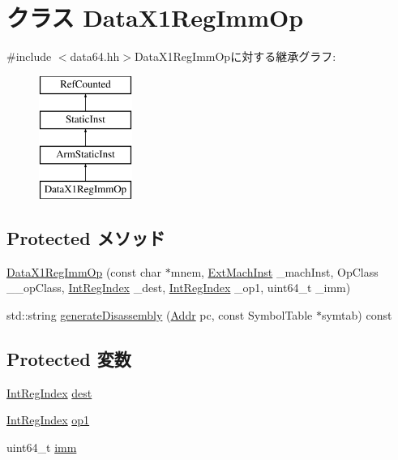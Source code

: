 \hypertarget{classArmISA_1_1DataX1RegImmOp}{
\section{クラス DataX1RegImmOp}
\label{classArmISA_1_1DataX1RegImmOp}
}


{\ttfamily \#include $<$data64.hh$>$}DataX1RegImmOpに対する継承グラフ:\begin{figure}[H]
\begin{center}
\leavevmode
\includegraphics[height=4cm]{classArmISA_1_1DataX1RegImmOp}
\end{center}
\end{figure}
\subsection*{Protected メソッド}
\begin{DoxyCompactItemize}
\item 
\hyperlink{classArmISA_1_1DataX1RegImmOp_a060333d6accb9a30048d5a4fae502f3b}{DataX1RegImmOp} (const char $\ast$mnem, \hyperlink{classStaticInst_a5605d4fc727eae9e595325c90c0ec108}{ExtMachInst} \_\-machInst, OpClass \_\-\_\-opClass, \hyperlink{namespaceArmISA_ae64680ba9fb526106829d6bf92fc791b}{IntRegIndex} \_\-dest, \hyperlink{namespaceArmISA_ae64680ba9fb526106829d6bf92fc791b}{IntRegIndex} \_\-op1, uint64\_\-t \_\-imm)
\item 
std::string \hyperlink{classArmISA_1_1DataX1RegImmOp_a95d323a22a5f07e14d6b4c9385a91896}{generateDisassembly} (\hyperlink{classm5_1_1params_1_1Addr}{Addr} pc, const SymbolTable $\ast$symtab) const 
\end{DoxyCompactItemize}
\subsection*{Protected 変数}
\begin{DoxyCompactItemize}
\item 
\hyperlink{namespaceArmISA_ae64680ba9fb526106829d6bf92fc791b}{IntRegIndex} \hyperlink{classArmISA_1_1DataX1RegImmOp_aec72e8e45bdc87abeeeb75d2a8a9a716}{dest}
\item 
\hyperlink{namespaceArmISA_ae64680ba9fb526106829d6bf92fc791b}{IntRegIndex} \hyperlink{classArmISA_1_1DataX1RegImmOp_a4c465c43ad568f8bcf8ae71480e9cfea}{op1}
\item 
uint64\_\-t \hyperlink{classArmISA_1_1DataX1RegImmOp_a2b4406ad2843b5aa12d244d01d8fdc69}{imm}
\end{DoxyCompactItemize}


